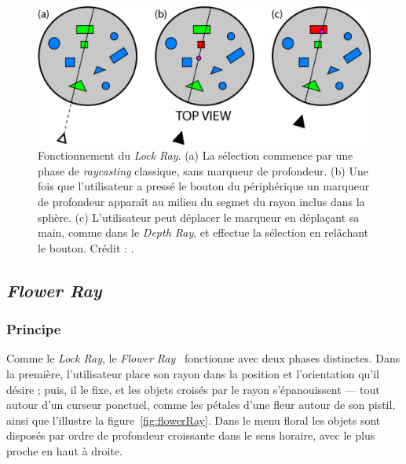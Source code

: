 	\begin{figure}[!htb]
		\centering
		\includegraphics[width=\rayWidth]{figures/ch2/lockRay}
		\caption[Principe du \emph{Lock Ray}]{Fonctionnement du \emph{Lock Ray}. (a) La sélection commence par une phase de \emph{raycasting} classique, sans marqueur de profondeur. (b) Une fois que l'utilisateur a pressé le bouton du périphérique un marqueur de profondeur apparaît au milieu du segmet du rayon inclus dans la sphère. (c) L'utilisateur peut déplacer le marqueur en déplaçant sa main, comme dans le \emph{Depth Ray}, et effectue la sélection en relâchant le bouton. Crédit : \cite{grossman2006design}.}
		\label{fig:lockRay}
	\end{figure}
	
	\subsection{\emph{Flower Ray}}
	\subsubsection{Principe}
	Comme le \emph{Lock Ray}, le \emph{Flower Ray}~\cite{grossman2006design} fonctionne avec deux phases distinctes. Dans la première, l'utilisateur place son rayon dans la position et l'orientation qu'il désire ; puis, il le fixe, et les objets croisés par le rayon \og s'épanouissent \fg{}  --- tout autour d'un curseur ponctuel, comme les pétales d'une fleur autour de son pistil, ainsi que l'illustre la figure~\ref{fig:flowerRay}. Dans le menu \og floral \fg{} les objets sont disposés par ordre de profondeur croissante dans le sens horaire, avec le plus proche en haut à droite.
	
